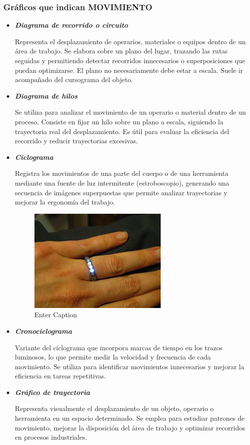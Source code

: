 \documentclass[a4paper,oneside,11pt]{article}
\begin{document}
\subsubsection{Gráficos que indican MOVIMIENTO}
\begin{itemize}
    \item \textbf{\textit{Diagrama de recorrido o circuito}}
    
    Representa el desplazamiento de operarios, materiales o equipos dentro de un área de trabajo. Se elabora sobre un plano del lugar, trazando las rutas seguidas y permitiendo detectar recorridos innecesarios o superposiciones que puedan optimizarse. El plano no necesariamente debe estar a escala. Suele ir acompañado del cursograma del objeto.
    
    \item \textbf{\textit{Diagrama de hilos}}

    Se utiliza para analizar el movimiento de un operario o material dentro de un proceso. Consiste en fijar un hilo sobre un plano a escala, siguiendo la trayectoria real del desplazamiento. Es útil para evaluar la eficiencia del recorrido y reducir trayectorias excesivas.
    
    \item \textbf{\textit{Ciclograma}}

    Registra los movimientos de una parte del cuerpo o de una herramienta mediante una fuente de luz intermitente (estroboscopio), generando una secuencia de imágenes superpuestas que permite analizar trayectorias y mejorar la ergonomía del trabajo.

    \begin{figure} [ht!]
        \centering
        \includegraphics[width=0.5\linewidth]{anillo.png}
        \caption{Enter Caption}
        \label{fig:anillo}
    \end{figure}
    
    \item \textbf{\textit{Cronociclograma}}

    Variante del ciclograma que incorpora marcas de tiempo en los trazos luminosos, lo que permite medir la velocidad y frecuencia de cada movimiento. Se utiliza para identificar movimientos innecesarios y mejorar la eficiencia en tareas repetitivas.
    
    \item \textbf{\textit{Gráfico de trayectoria}}

    Representa visualmente el desplazamiento de un objeto, operario o herramienta en un espacio determinado. Se emplea para estudiar patrones de movimiento, mejorar la disposición del área de trabajo y optimizar recorridos en procesos industriales.
\end{itemize}
\end{document}
